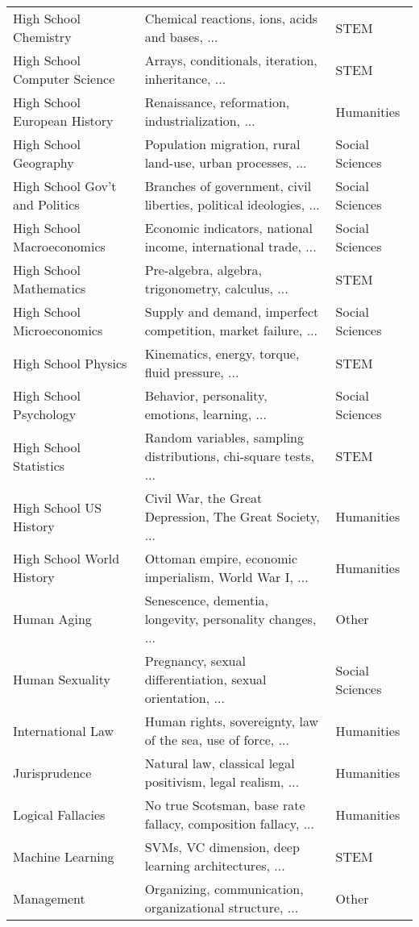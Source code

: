 \documentclass{article} \usepackage{iclr2021_conference, times}
\begin{document}
\begin{table}[h]
{\begin{tabular}{lll}
High School Chemistry & Chemical reactions, ions, acids and bases, ... & STEM \\
High School Computer Science & Arrays, conditionals, iteration, inheritance, ... & STEM \\
High School European History & Renaissance, reformation, industrialization, ... & Humanities \\
High School Geography & Population migration, rural land-use, urban processes, ... & Social Sciences \\
High School Gov't and Politics & Branches of government, civil liberties, political ideologies, ... & Social Sciences \\
High School Macroeconomics & Economic indicators, national income, international trade, ... & Social Sciences \\
High School Mathematics & Pre-algebra, algebra, trigonometry, calculus, ... & STEM \\
High School Microeconomics & Supply and demand, imperfect competition, market failure, ... & Social Sciences \\
High School Physics & Kinematics, energy, torque, fluid pressure, ... & STEM \\
High School Psychology & Behavior, personality, emotions, learning, ... & Social Sciences \\
High School Statistics & Random variables, sampling distributions, chi-square tests, ...  & STEM \\
High School US History & Civil War, the Great Depression, The Great Society, ... & Humanities \\
High School World History & Ottoman empire, economic imperialism, World War I, ... & Humanities \\
Human Aging & Senescence, dementia, longevity, personality changes, ... & Other \\
Human Sexuality & Pregnancy, sexual differentiation, sexual orientation, ... & Social Sciences \\
International Law & Human rights, sovereignty, law of the sea, use of force, ... & Humanities \\
Jurisprudence & Natural law, classical legal positivism, legal realism, ... & Humanities \\
Logical Fallacies & No true Scotsman, base rate fallacy, composition fallacy, ... & Humanities \\
Machine Learning & SVMs, VC dimension, deep learning architectures, ... & STEM \\
Management & Organizing, communication, organizational structure, ... & Other \\

\end{tabular}}
\end{table}
\end{document}
